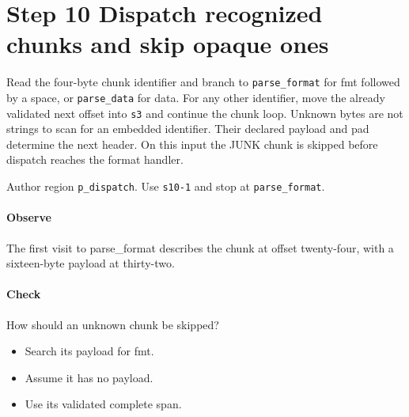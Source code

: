 \section{Step 10 Dispatch recognized chunks and skip opaque ones}\label{pcm-wav-s10}
Read the four-byte chunk identifier and branch to \texttt{parse\_format} for fmt followed by a space, or \texttt{parse\_data} for data. For any other identifier, move the already validated next offset into \texttt{s3} and continue the chunk loop. Unknown bytes are not strings to scan for an embedded identifier. Their declared payload and pad determine the next header. On this input the JUNK chunk is skipped before dispatch reaches the format handler.

Author region \texttt{p\_dispatch}. Use \texttt{s10-1} and stop at \texttt{parse\_format}.

\paragraph{Observe} The first visit to parse\_format describes the chunk at offset twenty-four, with a sixteen-byte payload at thirty-two.

\paragraph{Check} How should an unknown chunk be skipped?
\begin{itemize}
  \item[A.] Search its payload for fmt.
  \item[B.] Assume it has no payload.
  \item[C.] Use its validated complete span.
\end{itemize}
